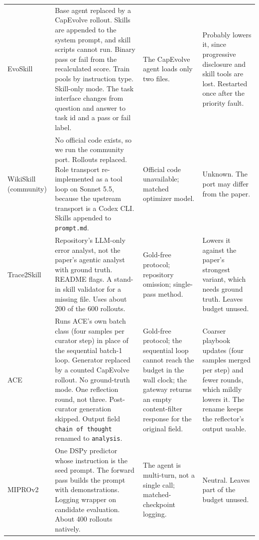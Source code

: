 \begin{table}[t]
\begin{tabularx}{\textwidth}{@{}l>{\raggedright\arraybackslash}X>{\raggedright\arraybackslash}X>{\raggedright\arraybackslash}X@{}}
EvoSkill & Base agent replaced by a CapEvolve rollout. Skills are appended to the system prompt, and skill scripts cannot run. Binary pass or fail from the recalculated score. Train pools by instruction type. Skill-only mode. The task interface changes from question and answer to task id and a pass or fail label. & The CapEvolve agent loads only two files. & Probably lowers it, since progressive disclosure and skill tools are lost. Restarted once after the priority fault. \\
WikiSkill (community) & No official code exists, so we run the community port. Rollouts replaced. Role transport re-implemented as a tool loop on Sonnet 5.5, because the upstream transport is a Codex CLI. Skills appended to \texttt{prompt.md}. & Official code unavailable; matched optimizer model. & Unknown. The port may differ from the paper. \\
Trace2Skill & Repository's LLM-only error analyst, not the paper's agentic analyst with ground truth. README flags. A stand-in skill validator for a missing file. Uses about 200 of the 600 rollouts. & Gold-free protocol; repository omission; single-pass method. & Lowers it against the paper's strongest variant, which needs ground truth. Leaves budget unused. \\
ACE & Runs ACE's own batch class (four samples per curator step) in place of the sequential batch-1 loop. Generator replaced by a counted CapEvolve rollout. No ground-truth mode. One reflection round, not three. Post-curator generation skipped. Output field \texttt{chain of thought} renamed to \texttt{analysis}. & Gold-free protocol; the sequential loop cannot reach the budget in the wall clock; the gateway returns an empty content-filter response for the original field. & Coarser playbook updates (four samples merged per step) and fewer rounds, which mildly lowers it. The rename keeps the reflector's output usable. \\
MIPROv2 & One DSPy predictor whose instruction is the seed prompt. The forward pass builds the prompt with demonstrations. Logging wrapper on candidate evaluation. About 400 rollouts natively. & The agent is multi-turn, not a single call; matched-checkpoint logging. & Neutral. Leaves part of the budget unused. \\

\end{tabularx}
\end{table}
